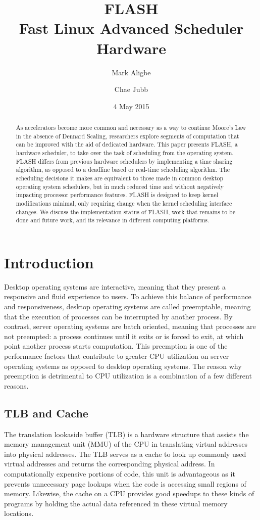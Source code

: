 \documentclass{sig-alternate-10pt}
\title{FLASH\\Fast Linux Advanced Scheduler Hardware}
\author{
	Mark Aligbe \\
	    \email{ma2799@columbia.edu}
	\and
    Chae Jubb \\
        \email{ecj2122@columbia.edu}
}
\date{4 May 2015}
\begin{document}
\maketitle

\begin{abstract}
As accelerators become more common and necessary as a way to continue
Moore's Law in the absence of Dennard Scaling, researchers explore segments
of computation that can be improved with the aid of dedicated hardware. This
paper presents FLASH, a hardware scheduler, to take over the task of
scheduling from the operating system. FLASH differs from previous hardware
schedulers by implementing a time sharing algorithm, as opposed to
a deadline based or real-time scheduling algorithm. The scheduling decisions
it makes are equivalent to those made in common desktop operating system
schedulers, but in much reduced time and without negatively impacting
processor performance features. FLASH is designed to keep kernel
modifications minimal, only requiring change when the kernel scheduling
interface changes. We discuss the implementation status of FLASH,
work that remains to be done and future work, and its relevance in different computing
platforms.

\end{abstract}


\section{Introduction}
\label{sec:intro}
Desktop operating systems are interactive, meaning that they present
a responsive and fluid experience to users. To achieve this balance of
performance and responsiveness, desktop operating systems are called
preemptable, meaning that the execution of processes can be interrupted by
another process. By contrast, server operating systems are batch oriented,
meaning that processes are not preempted: a process continues until it exits
or is forced to exit, at which point another process starts computation.
This preemption is one of the performance factors that contribute to greater
CPU utilization on server operating systems as opposed to desktop operating
systems. The reason why preemption is detrimental to CPU utilization is
a combination of a few different reasons.

\subsection{TLB and Cache}
The translation lookaside buffer (TLB) is a hardware structure that assists
the memory management unit (MMU) of the CPU in translating virtual addresses
into physical addresses. The TLB serves as a cache to look up commonly used
virtual addresses and returns the corresponding physical address. In
computationally expensive portions of code, this unit is advantageous as it
prevents unnecessary page lookups when the code is accessing small regions
of memory. Likewise, the cache on a CPU provides good speedups to these
kinds of programs by holding the actual data referenced in these virtual
memory locations.
\end{document}
